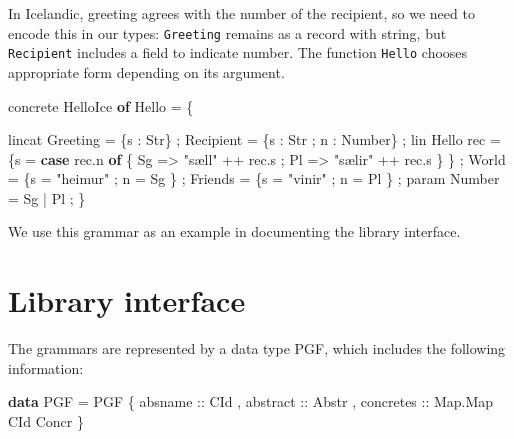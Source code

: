 \documentclass[]{article}
\newenvironment{Shaded}{\begin{snugshade}}{\end{snugshade}}
\newcommand{\KeywordTok}[1]{\textcolor[rgb]{0.13,0.29,0.53}{\textbf{{#1}}}}
\newcommand{\DataTypeTok}[1]{\textcolor[rgb]{0.13,0.29,0.53}{{#1}}}
\newcommand{\StringTok}[1]{\textcolor[rgb]{0.31,0.60,0.02}{{#1}}}
\newcommand{\OtherTok}[1]{\textcolor[rgb]{0.56,0.35,0.01}{{#1}}}
\newcommand{\FunctionTok}[1]{\textcolor[rgb]{0.00,0.00,0.00}{{#1}}}
\newcommand{\NormalTok}[1]{{#1}}
\begin{document}
In Icelandic, greeting agrees with the number of the recipient, so we
need to encode this in our types: \texttt{Greeting} remains as a record
with string, but \texttt{Recipient} includes a field to indicate number.
The function \texttt{Hello} chooses appropriate form depending on its
argument.

\begin{Shaded}
\begin{Highlighting}[]
\NormalTok{concrete }\DataTypeTok{HelloIce} \KeywordTok{of} \DataTypeTok{Hello} \FunctionTok{=} \NormalTok{\{}

\NormalTok{lincat}
  \DataTypeTok{Greeting}  \FunctionTok{=} \NormalTok{\{s }\FunctionTok{:} \DataTypeTok{Str}\NormalTok{\} ;}
  \DataTypeTok{Recipient} \FunctionTok{=} \NormalTok{\{s }\FunctionTok{:} \DataTypeTok{Str} \NormalTok{; n }\FunctionTok{:} \DataTypeTok{Number}\NormalTok{\} ;}
\NormalTok{lin}
  \DataTypeTok{Hello} \NormalTok{rec }\FunctionTok{=} \NormalTok{\{s }\FunctionTok{=} \KeywordTok{case} \NormalTok{rec}\FunctionTok{.}\NormalTok{n }\KeywordTok{of} \NormalTok{\{}
                 \DataTypeTok{Sg} \OtherTok{=>} \StringTok{"sæll"} \FunctionTok{++} \NormalTok{rec}\FunctionTok{.}\NormalTok{s ;}
                     \DataTypeTok{Pl} \OtherTok{=>} \StringTok{"sælir"} \FunctionTok{++} \NormalTok{rec}\FunctionTok{.}\NormalTok{s \} }
              \NormalTok{\} ;}
  \DataTypeTok{World} \FunctionTok{=} \NormalTok{\{s }\FunctionTok{=} \StringTok{"heimur"} \NormalTok{; n }\FunctionTok{=} \DataTypeTok{Sg} \NormalTok{\} ;}
  \DataTypeTok{Friends} \FunctionTok{=} \NormalTok{\{s }\FunctionTok{=} \StringTok{"vinir"} \NormalTok{; n }\FunctionTok{=} \DataTypeTok{Pl} \NormalTok{\} ;}
\NormalTok{param}
  \DataTypeTok{Number} \FunctionTok{=} \DataTypeTok{Sg} \FunctionTok{|} \DataTypeTok{Pl} \NormalTok{;}
\NormalTok{\}}
\end{Highlighting}
\end{Shaded}

We use this grammar as an example in documenting the library interface.

\section{Library interface}\label{library-interface}

The grammars are represented by a data type PGF, which includes the
following information:

\begin{Shaded}
\begin{Highlighting}[]
\KeywordTok{data} \DataTypeTok{PGF} \FunctionTok{=} \DataTypeTok{PGF} \NormalTok{\{}
\OtherTok{  absname   ::} \DataTypeTok{CId} \NormalTok{,}
\OtherTok{  abstract  ::} \DataTypeTok{Abstr} \NormalTok{,}
\OtherTok{  concretes ::} \DataTypeTok{Map.Map} \DataTypeTok{CId} \DataTypeTok{Concr}
  \NormalTok{\}}
\end{Highlighting}
\end{Shaded}
\end{document}
